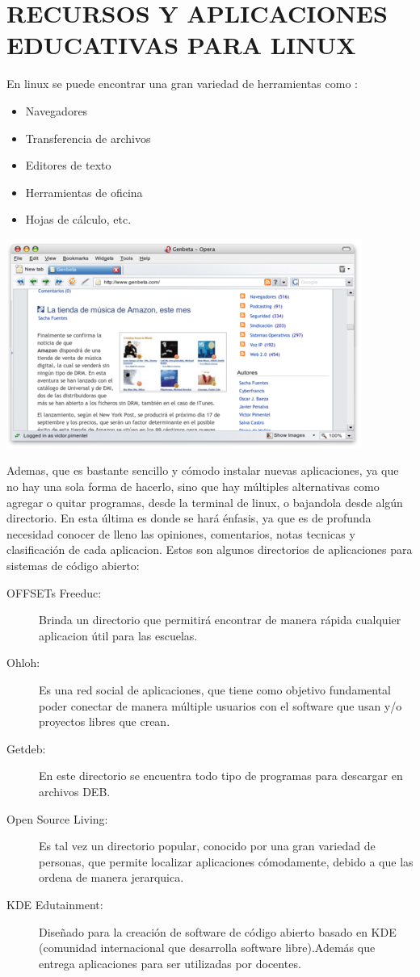 \section*{RECURSOS Y APLICACIONES EDUCATIVAS PARA LINUX}
En linux se puede encontrar una gran variedad de herramientas
como :
\begin{itemize}
  \item Navegadores
  \item Transferencia de archivos
  \item Editores de texto
  \item Herramientas de oficina
  \item Hojas de cálculo, etc.
\end{itemize}
\includegraphics[scale=0.5]{img/cp06/img0602.png}

Ademas, que es bastante sencillo y cómodo instalar nuevas
aplicaciones, ya que no hay una sola forma de hacerlo, sino que
hay múltiples alternativas como agregar o quitar programas,
desde la terminal de linux, o bajandola desde algún directorio.
En esta última es donde se hará énfasis, ya que es de profunda
necesidad conocer de lleno las opiniones, comentarios, notas
tecnicas y clasificación de cada aplicacion. Estos son algunos
directorios de aplicaciones para sistemas de código abierto:
\begin{description}
	\item[ OFFSETs Freeduc:] Brinda un directorio que permitirá encontrar
	de manera rápida cualquier aplicacion útil para las escuelas.
	\item[ Ohloh:] Es una red social de aplicaciones, que tiene como
	objetivo fundamental poder conectar de manera múltiple
	usuarios con el software que usan y/o proyectos libres que
	crean.
	\item[ Getdeb:] En este directorio se encuentra todo tipo de programas
	para descargar en archivos DEB.
	\item[ Open Source Living:]Es tal vez un directorio popular, conocido
	por una gran variedad de personas, que permite localizar
	aplicaciones cómodamente, debido a que las ordena de manera
	jerarquica.
	\item[ KDE Edutainment:] Diseñado para la creación de software de
	código abierto basado en KDE (comunidad internacional que
	desarrolla software libre).Además que entrega aplicaciones para
	ser utilizadas por docentes.
\end{description}

